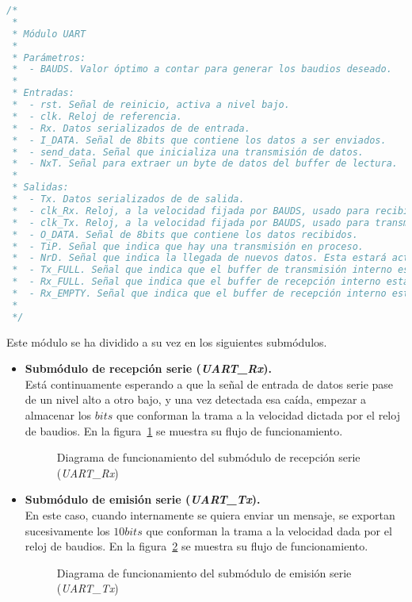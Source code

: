 \begin{lstlisting}[language=Verilog,
    caption={Parámetros, entradas y salidas del módulo UART.},
    label=src:resultados-modulos-uart]
/*
 *
 * Módulo UART
 *
 * Parámetros:
 *  - BAUDS. Valor óptimo a contar para generar los baudios deseado.
 *
 * Entradas:
 *  - rst. Señal de reinicio, activa a nivel bajo.
 *  - clk. Reloj de referencia.
 *  - Rx. Datos serializados de de entrada.
 *  - I_DATA. Señal de 8bits que contiene los datos a ser enviados.
 *  - send_data. Señal que inicializa una transmisión de datos.
 *  - NxT. Señal para extraer un byte de datos del buffer de lectura.
 *
 * Salidas:
 *  - Tx. Datos serializados de de salida.
 *  - clk_Rx. Reloj, a la velocidad fijada por BAUDS, usado para recibir los datos.
 *  - clk_Tx. Reloj, a la velocidad fijada por BAUDS, usado para transmitir los datos.
 *  - O_DATA. Señal de 8bits que contiene los datos recibidos.
 *  - TiP. Señal que indica que hay una transmisión en proceso.
 *  - NrD. Señal que indica la llegada de nuevos datos. Esta estará activa un pulso de clk.
 *  - Tx_FULL. Señal que indica que el buffer de transmisión interno está lleno.
 *  - Rx_FULL. Señal que indica que el buffer de recepción interno está lleno.
 *  - Rx_EMPTY. Señal que indica que el buffer de recepción interno está vacío.
 *
 */
\end{lstlisting}

Este módulo se ha dividido a su vez en los siguientes submódulos.
\begin{itemize}
    \item \textbf{Submódulo de recepción serie (\emph{UART\_Rx}).} \\
    Está continuamente esperando a que la señal de entrada de datos serie pase de un nivel alto a otro bajo, y una vez detectada esa caída, empezar a almacenar los $bits$ que conforman la trama a la velocidad dictada por el reloj de baudios. En la figura~\ref{fig:flujo_uart_rx} se muestra su flujo de funcionamiento.

    \begin{figure}[!hbt]
        \centering
        \scalebox{0.85} {}
        \caption{Diagrama de funcionamiento del submódulo de recepción serie (\emph{UART\_Rx})}
        \label{fig:flujo_uart_rx}
    \end{figure}
    
    \item \textbf{Submódulo de emisión serie (\emph{UART\_Tx}).} \\
    En este caso, cuando internamente se quiera enviar un mensaje, se exportan sucesivamente los $10bits$ que conforman la trama a la velocidad dada por el reloj de baudios. En la figura~\ref{fig:flujo_uart_tx} se muestra su flujo de funcionamiento.
    \begin{figure}[!hbt]
        \centering
        \scalebox{0.85} {}
        \caption{Diagrama de funcionamiento del submódulo de emisión serie (\emph{UART\_Tx})}
        \label{fig:flujo_uart_tx}
    \end{figure}
\end{itemize}

